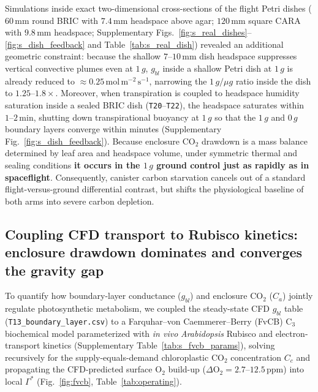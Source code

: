 \documentclass[final,5p,times,twocolumn,numbers,sort&compress]{elsarticle}
\newcommand{\molms}{\ensuremath{\mathrm{mol\,m^{-2}\,s^{-1}}}}
\begin{document}
Simulations inside exact two-dimensional cross-sections of the flight Petri dishes ($60\,\mathrm{mm}$ round BRIC with $7.4\,\mathrm{mm}$ headspace above agar; $120\,\mathrm{mm}$ square CARA with $9.8\,\mathrm{mm}$ headspace; Supplementary Figs.~\ref{fig:s_real_dishes}--\ref{fig:s_dish_feedback} and Table~\ref{tab:s_real_dish}) revealed an additional geometric constraint: because the shallow $7\text{--}10\,\mathrm{mm}$ dish headspace suppresses vertical convective plumes even at $1\,g$, $g_{bl}$ inside a shallow Petri dish at $1\,g$ is already reduced to $\approx 0.25\,\molms$, narrowing the $1\,g/\mu g$ ratio inside the dish to $1.25\text{--}1.8\times$. Moreover, when transpiration is coupled to headspace humidity saturation inside a sealed BRIC dish (\texttt{T20}--\texttt{T22}), the headspace saturates within $1\text{--}2\,\mathrm{min}$, shutting down transpirational buoyancy at $1\,g$ so that the $1\,g$ and $0\,g$ boundary layers converge within minutes (Supplementary Fig.~\ref{fig:s_dish_feedback}). Because enclosure $\mathrm{CO_2}$ drawdown is a mass balance determined by leaf area and headspace volume, under symmetric thermal and sealing conditions \textbf{it occurs in the $1\,g$ ground control just as rapidly as in spaceflight}. Consequently, canister carbon starvation cancels out of a standard flight-versus-ground differential contrast, but shifts the physiological baseline of both arms into severe carbon depletion.

\subsection{Coupling CFD transport to Rubisco kinetics: enclosure drawdown dominates and converges the gravity gap}\label{sec:fvcb}

To quantify how boundary-layer conductance ($g_{bl}$) and enclosure $\mathrm{CO_2}$ ($C_a$) jointly regulate photosynthetic metabolism, we coupled the steady-state CFD $g_{bl}$ table (\texttt{T13\_boundary\_layer.csv}) to a Farquhar--von Caemmerer--Berry (FvCB) $\mathrm{C_3}$ biochemical model \citep{farquhar1980} parameterized with \textit{in vivo} \textit{Arabidopsis} Rubisco and electron-transport kinetics \citep{bernacchi2001,bernacchi2003} (Supplementary Table~\ref{tab:s_fvcb_params}), solving recursively for the supply-equals-demand chloroplastic $\mathrm{CO_2}$ concentration $C_c$ and propagating the CFD-predicted surface $\mathrm{O_2}$ build-up ($\Delta\mathrm{O_2} = 2.7\text{--}12.5\,\mathrm{ppm}$) into local $\Gamma^*$ (Fig.~\ref{fig:fvcb}, Table~\ref{tab:operating}).
\end{document}
